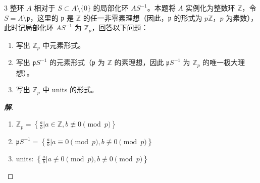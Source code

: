 \documentclass[12pt, a4paper]{article}
\newenvironment{solution}{
    \begin{proof}[\textbf{解}]
}{
    \end{proof}
}
\begin{document}
\begin{problem}{3}
    整环 $A$ 相对于 $S \subset A \setminus \{0\}$ 的局部化环 $AS^{-1}$。本题将 $A$ 实例化为整数环 $\mathbb{Z}$，令 $S = A \setminus \mathfrak{p}$，这里的 $\mathfrak{p}$ 是 $\mathbb{Z}$ 的任一非零素理想（因此，$\mathfrak{p}$ 的形式为 $p\mathbb{Z}$，$p$ 为素数），此时记局部化环 $AS^{-1}$ 为 $\mathbb{Z}_p$，回答以下问题：
    \begin{enumerate}[(1)]
        \item 写出 $\mathbb{Z}_p$ 中元素形式。
        \item 写出 $\mathfrak{p}S^{-1}$ 的元素形式（$\mathfrak{p}$ 为 $\mathbb{Z}$ 的素理想，因此 $\mathfrak{p}S^{-1}$ 为 $\mathbb{Z}_p$ 的唯一极大理想）。
        \item 写出 $\mathbb{Z}_p$ 中 units 的形式。
    \end{enumerate}
\end{problem}
\begin{solution}
    \begin{enumerate}[(1)]
        \item $\mathbb{Z}_p = \left\{ \frac{a}{b} \mathrel{\Big|} a \in \mathbb{Z}, b \not\equiv 0 \pmod p \right\}$
        \item $\mathfrak{p}S^{-1} = \left\{ \frac{a}{b} \mathrel{\Big|} a \equiv 0 \pmod p, b \not\equiv 0 \pmod p \right\}$
        \item units: $\left\{ \frac{a}{b} \mathrel{\Big|} a \not\equiv 0 \pmod p, b \not\equiv 0 \pmod p \right\}$
    \end{enumerate}
\end{solution}
\end{document}
